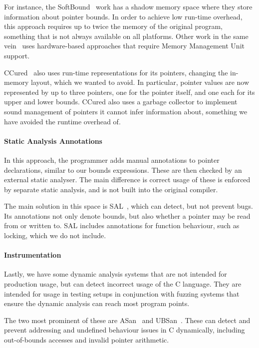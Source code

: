 For instance, the SoftBound~\cite{Nagarakatte2009} work has a shadow
memory space where they store information about pointer bounds. In
order to achieve low run-time overhead, this approach requires up to
twice the memory of the original program, something that is not always
available on all platforms. Other work in the same
vein~\cite{Nagarakatte2015} uses hardware-based approaches that
require Memory Management Unit support.

CCured~\cite{Necula2005} also uses run-time representations for its
pointers, changing the in-memory layout, which we wanted to avoid. In
particular, pointer values are now represented by up to three
pointers, one for the pointer itself, and one each for its upper and
lower bounds. CCured also uses a garbage collector to implement sound
management of pointers it cannot infer information about, something we
have avoided the runtime overhead of.

\paragraph{Static Analysis Annotations} In this approach, the
programmer adds manual annotations to pointer declarations, similar to
our bounds expressions. These are then checked by an external static
analyser. The main difference is correct usage of these is enforced by
separate static analysis, and is not built into the original compiler.

The main solution in this space is SAL~\cite{MicrosoftSAL}, which can
detect, but not prevent bugs. Its annotations not only denote bounds,
but also whether a pointer may be read from or written to. SAL
includes annotations for function behaviour, such as locking, which we
do not include.

\paragraph{Instrumentation} Lastly, we have some dynamic analysis
systems that are not intended for production usage, but can detect
incorrect usage of the C language. They are intended for usage in
testing setups in conjunction with fuzzing systems that ensure the
dynamic analysis can reach most program points.

The two most prominent of these are ASan~\cite{Serebryany2012} and
UBSan~\cite{UBSan}. These can detect and prevent addressing and
undefined behaviour issues in C dynamically, including out-of-bounds
accesses and invalid pointer arithmetic.



